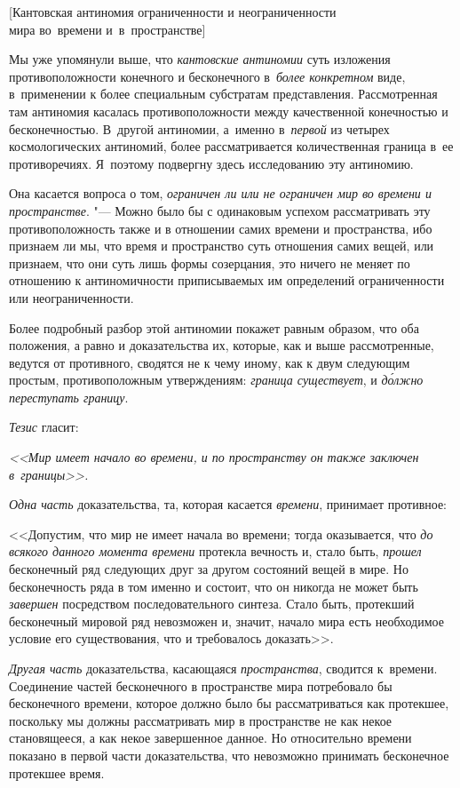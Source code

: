%
{[Кантовская антиномия ограниченности и неограниченности\nopagebreak\\
мира во~времени и~в~пространстве]}

Мы уже упомянули выше, что {\em кантовские антиномии} суть изложения
противоположности конечного и бесконечного в~{\em более конкретном} виде,
в~применении к более специальным субстратам представления. Рассмотренная там
антиномия касалась противоположности между качественной конечностью и
бесконечностью. В~другой антиномии, а~именно в~{\em первой} из четырех
космологических антиномий, более рассматривается количественная граница в~ее
противоречиях. Я~поэтому подвергну здесь исследованию эту антиномию.

Она касается вопроса о том,
{\em ограничен ли или не ограничен мир во времени и пространстве}. "--- Можно
было бы с одинаковым успехом рассматривать эту противоположность также
и в отношении самих времени и пространства, ибо признаем ли мы, что время
и пространство суть отношения самих вещей, или признаем, что они суть лишь
формы созерцания, это ничего не меняет по отношению к антиномичности
приписываемых им определений ограниченности или неограниченности.

Более подробный разбор этой антиномии покажет равным образом, что оба
положения, а равно и доказательства их, которые, как и выше рассмотренные,
ведутся от противного, сводятся не к чему иному, как к двум следующим простым,
противоположным утверждениям: {\em граница существует}, и
{\em д\'{о}лжно переступать границу}.

{\em Тезис} гласит:

{\em <<Мир имеет начало во времени, и по пространству он
также заключен в~границы>>.}

{\em Одна часть} доказательства, та, которая касается
{\em времени}, принимает противное:

<<Допустим, что мир не имеет начала во времени; тогда оказывается, что
{\em до всякого данного момента времени} протекла вечность и, стало быть,
{\em прошел} бесконечный ряд следующих друг за другом состояний вещей в мире.
Но бесконечность ряда в том именно и состоит, что он никогда не может быть
{\em завершен} посредством последовательного синтеза. Стало быть, протекший
бесконечный мировой ряд невозможен и, значит, начало мира есть необходимое
условие его существования, что и требовалось доказать>>.

{\em Другая часть} доказательства, касающаяся {\em пространства}, сводится
к~времени. Соединение частей бесконечного в пространстве мира потребовало бы
бесконечного времени, которое должно было бы рассматриваться как протекшее,
поскольку мы должны рассматривать мир в пространстве не как некое становящееся,
а как некое завершенное данное. Но относительно времени показано в первой части
доказательства, что невозможно принимать бесконечное протекшее время.

